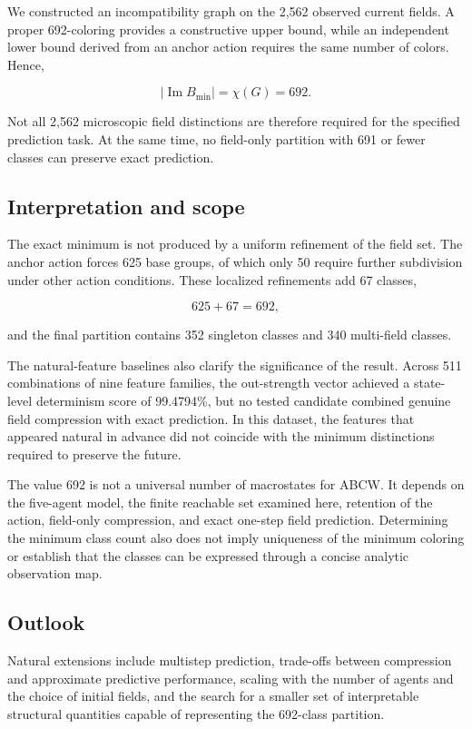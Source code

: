 \documentclass[
  11pt,
]{article}
\begin{document}
We constructed an incompatibility graph on the 2,562 observed current
fields. A proper 692-coloring provides a constructive upper bound, while
an independent lower bound derived from an anchor action requires the
same number of colors. Hence,

\[{|\operatorname{Im}B_{\min}|=\chi(G)=692.}\]

Not all 2,562 microscopic field distinctions are therefore required for
the specified prediction task. At the same time, no field-only partition
with 691 or fewer classes can preserve exact prediction.

\hypertarget{interpretation-and-scope}{%
\subsection{Interpretation and scope}\label{interpretation-and-scope}}

The exact minimum is not produced by a uniform refinement of the field
set. The anchor action forces 625 base groups, of which only 50 require
further subdivision under other action conditions. These localized
refinements add 67 classes,

\[{625+67=692,}\]

and the final partition contains 352 singleton classes and 340
multi-field classes.

The natural-feature baselines also clarify the significance of the
result. Across 511 combinations of nine feature families, the
out-strength vector achieved a state-level determinism score of
99.4794\%, but no tested candidate combined genuine field compression
with exact prediction. In this dataset, the features that appeared
natural in advance did not coincide with the minimum distinctions
required to preserve the future.

The value 692 is not a universal number of macrostates for ABCW. It
depends on the five-agent model, the finite reachable set examined here,
retention of the action, field-only compression, and exact one-step
field prediction. Determining the minimum class count also does not
imply uniqueness of the minimum coloring or establish that the classes
can be expressed through a concise analytic observation map.

\hypertarget{outlook}{%
\subsection{Outlook}\label{outlook}}

Natural extensions include multistep prediction, trade-offs between
compression and approximate predictive performance, scaling with the
number of agents and the choice of initial fields, and the search for a
smaller set of interpretable structural quantities capable of
representing the 692-class partition.
\end{document}
